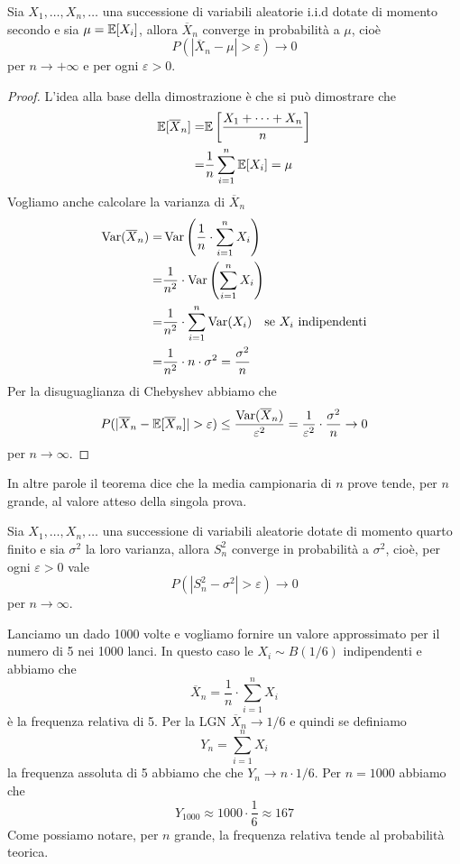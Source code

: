 \begin{theorem}\label{th: lgn}
	Sia $X_1, \dots, X_n, \dots$ una successione di variabili aleatorie i.i.d dotate di momento
	secondo e sia $\mu = \mathbb{E}[X_i]$, allora $\overline{X}_n$ converge in probabilità a $\mu$, cioè
	\[ P(|\overline{X}_n - \mu| > \varepsilon) \to 0 \]
	per $n \to +\infty$ e per ogni $\varepsilon > 0$.
	\begin{proof}
		L'idea alla base della dimostrazione è che si può dimostrare che
		\begin{align*}
			\mathbb{E}[\overline{X}_n] = & \mathbb{E}\left[ \frac{X_1 + \dots + X_n}{n} \right] \\
			=                    & \frac{1}{n} \sum_{i=1}^n \mathbb{E}[X_i] = \mu
		\end{align*}
		Vogliamo anche calcolare la varianza di $\overline{X}_n$
		\begin{align*}
			\operatorname{Var}(\overline{X}_n) = & \operatorname{Var} \left( \frac{1}{n} \cdot \sum_{i=1}^n X_i \right)    \\
			=                      & \frac{1}{n^2} \cdot \operatorname{Var} \left( \sum_{i=1}^n X_i \right)  \\
			=                      & \frac{1}{n^2} \cdot \sum_{i=1}^n \operatorname{Var}(X_i)
			\quad \text{se $X_i$ indipendenti}                                                 \\
			=                      & \frac{1}{n^2} \cdot n \cdot \sigma^2 = \frac{\sigma^2}{n}
		\end{align*}
		Per la disuguaglianza di Chebyshev abbiamo che
		\[
			P(|\overline{X}_n - \mathbb{E}[\overline{X}_n]| >
			\varepsilon) \leq \frac{\operatorname{Var}(\overline{X}_n)}{\varepsilon^2} =
			\frac{1}{\varepsilon^2} \cdot \frac{\sigma^2}{n} \to 0
		\]
		per $n \to \infty$.
	\end{proof}
\end{theorem}

In altre parole il teorema dice che la media campionaria di $n$ prove tende, per $n$ grande, al
valore atteso della singola prova.

\begin{corollary}\label{cor: lgn}
	Sia $X_1, \dots, X_n, \dots$ una successione di variabili aleatorie dotate di momento quarto
	finito e sia $\sigma^2$ la loro varianza, allora $S_n^2$ converge in probabilità a $\sigma^2$,
	cioè, per ogni $\varepsilon > 0$ vale
	\[ P(|S_n^2 - \sigma^2| > \varepsilon) \to 0 \]
	per $n \to \infty$.
\end{corollary}

\begin{example}
	Lanciamo un dado 1000 volte e vogliamo fornire un valore approssimato per il numero di 5 nei
	1000 lanci. In questo caso le $X_i \sim B(1/6)$ indipendenti e abbiamo che
	\[ \overline{X}_n = \frac{1}{n} \cdot \sum_{i=1}^{n} X_i \]
	è la frequenza relativa di 5. Per la LGN $\overline{X}_n \to 1/6$ e quindi se definiamo
	\[ Y_n = \sum_{i=1}^{n} X_i \]
	la frequenza assoluta di 5 abbiamo che che $Y_n \to n \cdot 1/6$. Per $n=1000$ abbiamo che
	\[ Y_{1000} \approx 1000 \cdot \frac{1}{6} \approx 167 \]
	Come possiamo notare, per $n$ grande, la frequenza relativa tende al probabilità teorica.
\end{example}

